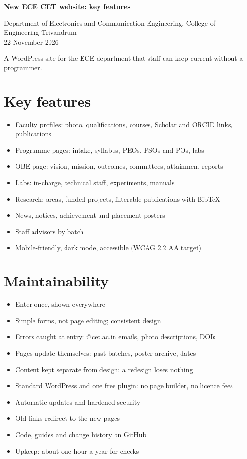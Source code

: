 \documentclass[11pt,a4paper]{article}
\begin{document}
{\LARGE\bfseries New ECE CET website: key features}\par
\vspace{4pt}
{\small Department of Electronics and Communication Engineering, College of Engineering Trivandrum\\ 22 November 2026}\par
\vspace{10pt}

A WordPress site for the ECE department that staff can keep current without a programmer.

\section*{Key features}
\begin{itemize}
  \item Faculty profiles: photo, qualifications, courses, Scholar and ORCID links, publications
  \item Programme pages: intake, syllabus, PEOs, PSOs and POs, labs
  \item OBE page: vision, mission, outcomes, committees, attainment reports
  \item Labs: in-charge, technical staff, experiments, manuals
  \item Research: areas, funded projects, filterable publications with BibTeX
  \item News, notices, achievement and placement posters
  \item Staff advisors by batch
  \item Mobile-friendly, dark mode, accessible (WCAG 2.2 AA target)
\end{itemize}

\section*{Maintainability}
\begin{itemize}
  \item Enter once, shown everywhere
  \item Simple forms, not page editing; consistent design
  \item Errors caught at entry: @cet.ac.in emails, photo descriptions, DOIs
  \item Pages update themselves: past batches, poster archive, dates
  \item Content kept separate from design: a redesign loses nothing
  \item Standard WordPress and one free plugin: no page builder, no licence fees
  \item Automatic updates and hardened security
  \item Old links redirect to the new pages
  \item Code, guides and change history on GitHub
  \item Upkeep: about one hour a year for checks
\end{itemize}
\end{document}
